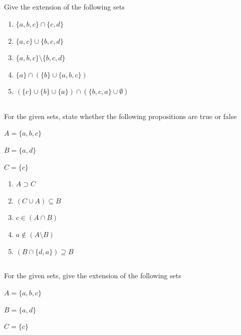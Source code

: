 \documentclass[twocolumn]{article}
\newcommand\mrk[1]{}
\begin{document}
\subsection{}

    Give the extension of the following sets

    \begin{enumerate}
        \item $\{ a, b, c \} \cap \{ c, d \} $ \mrk{1}
        \item $\{ a, c \} \cup \{ b, c, d \} $ \mrk{1}
        \item $\{ a, b, c \} \setminus \{ b, c, d \} $ \mrk{1}
        \item $\{ a \} \cap ( \{ b \} \cup \{a, b, c\} ) $ \mrk{1}
        \item $ (\{ c \} \cup \{ b \} \cup \{a\}) \cap ( \{b, c, a\} \cup \emptyset ) $ \mrk{1}
    \end{enumerate}

\subsection{}

    For the given sets, state whether the following propositions are true or false

    $ A = \{ a, b, c \} $

    $ B = \{ a, d \} $

    $ C = \{ c \} $

    \begin{enumerate}
        \item $ A \supset C $ \mrk{1}
        \item $ (C \cup A) \subseteq B $ \mrk{1}
        \item $ c \in ( A \cap B ) $ \mrk{1}
        \item $ a \not \in ( A \setminus B ) $ \mrk{1}
        \item $(B \cap \{d, a\} ) \supseteq B$ \mrk{1}
    \end{enumerate}

\subsection{}

    For the given sets, give the extension of the following sets

    $ A = \{ a, b, c \} $

    $ B = \{ a, d \} $

    $ C = \{ c \} $
\end{document}
